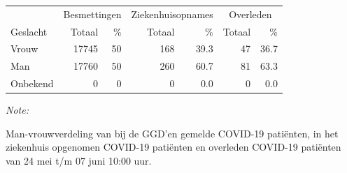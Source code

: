 \documentclass[
  english,
  man,floatsintext]{apa6}
\begin{document}
\begin{table}
\centering\begingroup\fontsize{11}{13}\selectfont

\begin{threeparttable}
\begin{tabular}{lrrrrrr}
\toprule
\multicolumn{1}{c}{ } & \multicolumn{2}{c}{Besmettingen} & \multicolumn{2}{c}{Ziekenhuisopnames} & \multicolumn{2}{c}{Overleden} \\
\cmidrule(l{3pt}r{3pt}){2-3} \cmidrule(l{3pt}r{3pt}){4-5} \cmidrule(l{3pt}r{3pt}){6-7}
Geslacht & Totaal & \% & Totaal & \% & Totaal & \%\\
\midrule
Vrouw & 17745 & 50 & 168 & 39.3 & 47 & 36.7\\
Man & 17760 & 50 & 260 & 60.7 & 81 & 63.3\\
Onbekend & 0 & 0 & 0 & 0.0 & 0 & 0.0\\
\bottomrule
\end{tabular}
\begin{tablenotes}
\item \textit{Note: } 
\item Man-vrouwverdeling van bij de GGD’en gemelde COVID-19 patiënten, in het ziekenhuis opgenomen COVID-19 patiënten en overleden COVID-19 patiënten van 24 mei t/m 07 juni 10:00 uur.
\end{tablenotes}
\end{threeparttable}
\endgroup{}
\end{table}
\newpage
\end{document}
